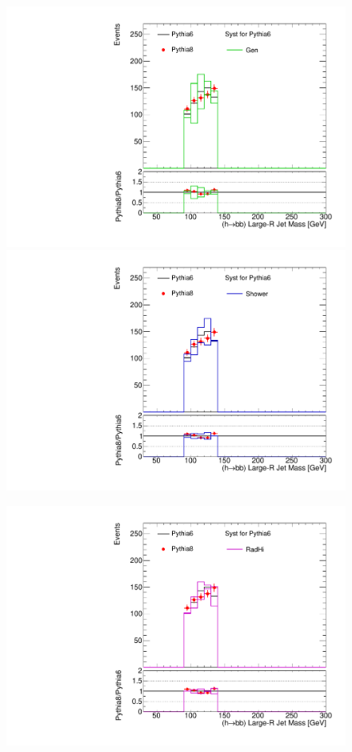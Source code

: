 \begin{figure}[!h]
\begin{center}
\includegraphics[scale=0.33]{./figures/boosted/TTBarPy6VsPy8/TTBarPy6VsPy8_SR_HbbMass_gen}   
\includegraphics[scale=0.33]{./figures/boosted/TTBarPy6VsPy8/TTBarPy6VsPy8_SR_HbbMass_shower} \\
\par\medskip
\includegraphics[scale=0.33]{./figures/boosted/TTBarPy6VsPy8/TTBarPy6VsPy8_SR_HbbMass_radhi}

\end{center}
\end{figure}
